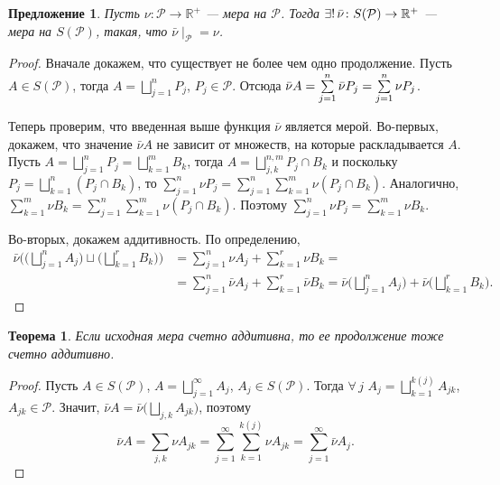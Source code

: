 \documentclass[12pt,titlepage]{article}
\newcounter{tema}
\newtheorem{theorem}{Теорема}[tema]
\newtheorem{predl}{Предложение}[tema]
\theoremstyle{definition}
\newcommand*{\p}[1]{#1\nobreak\discretionary{}{\hbox{$\mathsurround=0pt #1$}}{}}
\begin{document}
\begin{predl}
Пусть $\nu\colon \mathcal{P}\to\mathbb{R}^+$ --- мера на
$\mathcal{P}$. Тогда $\exists !\, \bar{\nu}\colon
S(\mathcal{P})\p\to\mathbb{R}^+$ --- мера на $S(\mathcal{P})$,
такая, что $\bar{\nu}\mid_\mathcal{P}=\nu$.
\end{predl}

\begin{proof}
Вначале докажем, что существует не более чем одно продолжение. Пусть
$A\in S(\mathcal{P})$, тогда $A=\bigsqcup\limits_{j=1}^n P_j$,
$P_j\in\mathcal{P}$. Отсюда
$\bar{\nu}A\p=\sum\limits_{j=1}^n\bar{\nu}P_j=\sum\limits_{j=1}^n
\nu P_j$.

Теперь проверим, что введенная выше функция $\bar{\nu}$ является
мерой. Во-первых, докажем, что значение $\bar{\nu}A$ не зависит от
множеств, на которые раскладывается $A$. Пусть
$A=\bigsqcup\limits_{j=1}^n P_j=\bigsqcup\limits_{k=1}^m B_k$, тогда
$A=\bigsqcup\limits_{j,k}^{n,m}P_j\cap B_k$ и поскольку
$P_j=\bigsqcup\limits_{k=1}^n (P_j\cap B_k)$, то
$\sum\limits_{j=1}^n \nu
P_j=\sum\limits_{j=1}^n\sum\limits_{k=1}^m\nu(P_j\cap B_k)$.
Аналогично, $\sum\limits_{k=1}^m \nu
B_k=\sum\limits_{j=1}^n\sum\limits_{k=1}^m\nu(P_j\cap B_k)$. Поэтому
$\sum\limits_{j=1}^n\nu P_j=\sum\limits_{k=1}^m\nu B_k$.

Во-вторых, докажем аддитивность. По определению,
\begin{align*}
\bar{\nu}\Big(\Big(\bigsqcup\limits_{j=1}^n A_j\Big)\sqcup
\Big(\bigsqcup\limits_{k=1}^r B_k\Big)\Big)&=\sum\limits_{j=1}^n\nu
A_j+\sum\limits_{k=1}^r \nu
B_k=\\
&=\sum\limits_{j=1}^n\bar{\nu}A_j+\sum\limits_{k=1}^r\bar{\nu}B_k=
\bar{\nu}\Big(\bigsqcup\limits_{j=1}^n
A_j\Big)+\bar{\nu}\Big(\bigsqcup\limits_{k=1}^r B_k\Big).
\end{align*}
\end{proof}

\begin{theorem}
Если исходная мера счетно аддитивна, то ее продолжение тоже счетно
аддитивно.
\end{theorem}

\begin{proof}
Пусть $A\in S(\mathcal{P})$, $A=\bigsqcup\limits_{j=1}^\infty A_j$,
$A_j\in S(\mathcal{P})$. Тогда $\forall\, j$
$A_j=\bigsqcup\limits_{k=1}^{k(j)}A_{jk}$, $A_{jk}\in\mathcal{P}$.
Значит,
$\bar{\nu}A=\bar{\nu}\Big(\bigsqcup\limits_{j,k}A_{jk}\Big)$,
поэтому $$\bar{\nu}A=\sum\limits_{j,k}\nu
A_{jk}=\sum\limits_{j=1}^\infty \sum\limits_{k=1}^{k(j)}\nu
A_{jk}=\sum\limits_{j=1}^\infty\bar{\nu}A_j.$$
\end{proof}
\end{document}
